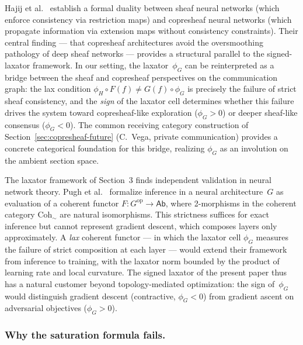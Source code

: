 \begin{remark}
\label{rem:copresheaf-duality}
Hajij et al.~\cite{hajij2025copresheaf} establish a formal duality
between sheaf neural networks (which enforce consistency via
restriction maps) and copresheaf neural networks (which propagate
information via extension maps without consistency constraints).
Their central finding --- that copresheaf architectures avoid the
oversmoothing pathology of deep sheaf networks --- provides a
structural parallel to the signed-laxator framework.  In our
setting, the laxator~$\phi_G$ can be reinterpreted as a bridge
between the sheaf and copresheaf perspectives on the communication
graph: the lax condition $\phi_{H} \circ F(f) \neq G(f) \circ
\phi_{G}$ is precisely the failure of strict sheaf consistency, and
the \emph{sign} of the laxator cell determines whether this failure
drives the system toward copresheaf-like exploration ($\phi_G > 0$)
or deeper sheaf-like consensus ($\phi_G < 0$).  The common receiving category construction of
Section~\ref{sec:copresheaf-future} (C.~Vega, private communication)
provides a concrete categorical foundation for this bridge, realizing
$\phi_G$ as an involution on the ambient section space.
\end{remark}

\begin{remark}
\label{rem:coherent-functors}
The laxator framework of Section~3 finds independent validation in
neural network theory.  Pugh et al.~\cite{pugh2026coherent}
formalize inference in a neural architecture~$G$ as evaluation of
a coherent functor $F \colon G^{\mathrm{op}} \to \mathsf{Ab}$,
where 2-morphisms in the coherent category $\mathrm{Coh}_\sim$
are natural isomorphisms.  This strictness suffices for exact
inference but cannot represent gradient descent, which composes
layers only approximately.  A \emph{lax} coherent functor ---
in which the laxator cell $\phi_G$ measures the failure of strict
composition at each layer --- would extend their framework from
inference to training, with the laxator norm bounded by the
product of learning rate and local curvature.  The signed laxator
of the present paper thus has a natural customer beyond
topology-mediated optimization: the sign of~$\phi_G$ would
distinguish gradient descent (contractive, $\phi_G < 0$) from
gradient ascent on adversarial objectives ($\phi_G > 0$).
\end{remark}

\subsubsection{Why the saturation formula fails.}

